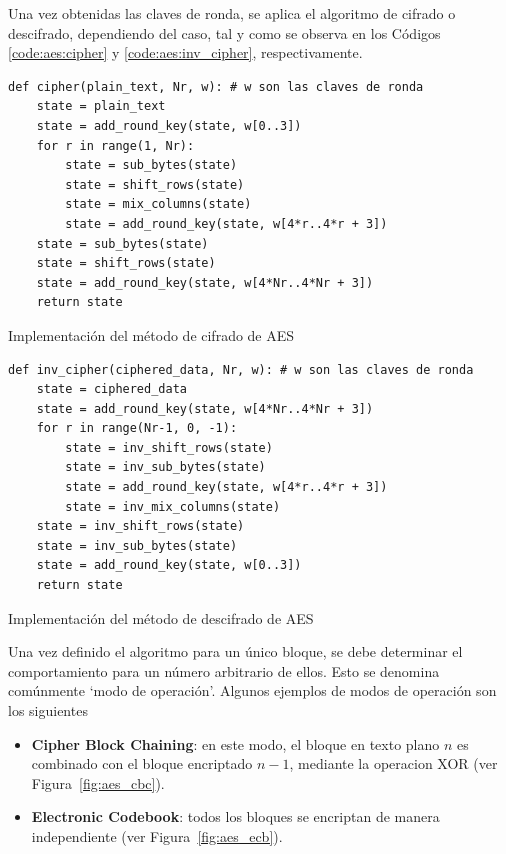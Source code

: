 \documentclass[11pt]{article}
\begin{document}
Una vez obtenidas las claves de ronda, se aplica el algoritmo de cifrado o descifrado, dependiendo del caso, tal y como se observa en los Códigos \ref{code:aes:cipher} y \ref{code:aes:inv_cipher}, respectivamente.

\begin{listing}[h] %
\begin{verbatim}
def cipher(plain_text, Nr, w): # w son las claves de ronda
    state = plain_text
    state = add_round_key(state, w[0..3])
    for r in range(1, Nr):
        state = sub_bytes(state)
        state = shift_rows(state)
        state = mix_columns(state)
        state = add_round_key(state, w[4*r..4*r + 3])
    state = sub_bytes(state)
    state = shift_rows(state)
    state = add_round_key(state, w[4*Nr..4*Nr + 3])
    return state
\end{verbatim}
\caption{Implementación del método de cifrado de AES}
\label{code:aes:cipher}
\end{listing}

\begin{listing}[h] %
\begin{verbatim}
def inv_cipher(ciphered_data, Nr, w): # w son las claves de ronda
    state = ciphered_data
    state = add_round_key(state, w[4*Nr..4*Nr + 3])
    for r in range(Nr-1, 0, -1):
        state = inv_shift_rows(state)
        state = inv_sub_bytes(state)
        state = add_round_key(state, w[4*r..4*r + 3])
        state = inv_mix_columns(state)
    state = inv_shift_rows(state)
    state = inv_sub_bytes(state)
    state = add_round_key(state, w[0..3])
    return state
\end{verbatim}
\caption{Implementación del método de descifrado de AES}
\label{code:aes:inv_cipher}
\end{listing}

Una vez definido el algoritmo para un único bloque, se debe determinar el comportamiento para un número arbitrario de ellos. Esto se denomina comúnmente `modo de operación'. Algunos ejemplos de modos de operación son los siguientes

\begin{itemize}
    \item \textbf{Cipher Block Chaining}: en este modo, el bloque en texto plano $n$ es combinado con el bloque encriptado $n - 1$, mediante la operacion XOR (ver Figura~\ref{fig:aes_cbc}).
    \item \textbf{Electronic Codebook}: todos los bloques se encriptan de manera independiente (ver Figura~\ref{fig:aes_ecb}).
\end{itemize}
\end{document}
